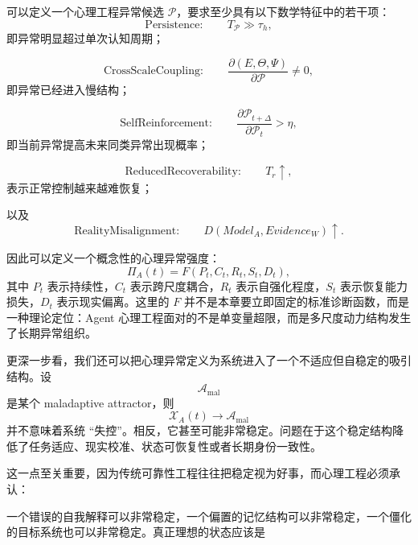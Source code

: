 可以定义一个心理工程异常候选 $\mathcal{P}$，要求至少具有以下数学特征中的若干项：
\begin{equation}
    \text{Persistence}:
    \qquad
    T_{\mathcal{P}}
    \gg
    \tau_h,
\end{equation}
即异常明显超过单次认知周期；

\begin{equation}
    \text{CrossScaleCoupling}:
    \qquad
    \frac{\partial(E,\Theta,\Psi)}
    {\partial \mathcal{P}}
    \neq 0,
\end{equation}
即异常已经进入慢结构；

\begin{equation}
    \text{SelfReinforcement}:
    \qquad
    \frac{\partial \mathcal{P}_{t+\Delta}}
    {\partial \mathcal{P}_t}
    >\eta,
\end{equation}
即当前异常提高未来同类异常出现概率；

\begin{equation}
    \text{ReducedRecoverability}:
    \qquad
    T_r\uparrow,
\end{equation}
表示正常控制越来越难恢复；

以及
\begin{equation}
    \text{RealityMisalignment}:
    \qquad
    D(
    Model_A,
    Evidence_W
    )
    \uparrow.
\end{equation}

因此可以定义一个概念性的心理异常强度：
\begin{equation}
    \Pi_A(t)
    =
    F
    \left(
    P_t,
    C_t,
    R_t,
    S_t,
    D_t
    \right),
\end{equation}
其中 $P_t$ 表示持续性，$C_t$ 表示跨尺度耦合，$R_t$ 表示自强化程度，$S_t$ 表示恢复能力损失，$D_t$ 表示现实偏离。这里的 $F$ 并不是本章要立即固定的标准诊断函数，而是一种理论定位：Agent 心理工程面对的不是单变量超限，而是多尺度动力结构发生了长期异常组织。

更深一步看，我们还可以把心理异常定义为系统进入了一个不适应但自稳定的吸引结构。设
\begin{equation}
    \mathcal{A}_{\mathrm{mal}}
\end{equation}
是某个 maladaptive attractor，则
\begin{equation}
    \mathcal{X}_A(t)
    \rightarrow
    \mathcal{A}_{\mathrm{mal}}
\end{equation}
并不意味着系统 ``失控''。相反，它甚至可能非常稳定。问题在于这个稳定结构降低了任务适应、现实校准、状态可恢复性或者长期身份一致性。

这一点至关重要，因为传统可靠性工程往往把稳定视为好事，而心理工程必须承认：
\begin{statementbox}
\centering
{}
\end{statementbox}
一个错误的自我解释可以非常稳定，一个偏置的记忆结构可以非常稳定，一个僵化的目标系统也可以非常稳定。真正理想的状态应该是
\begin{statementbox}
\centering
{}
\end{statementbox}

